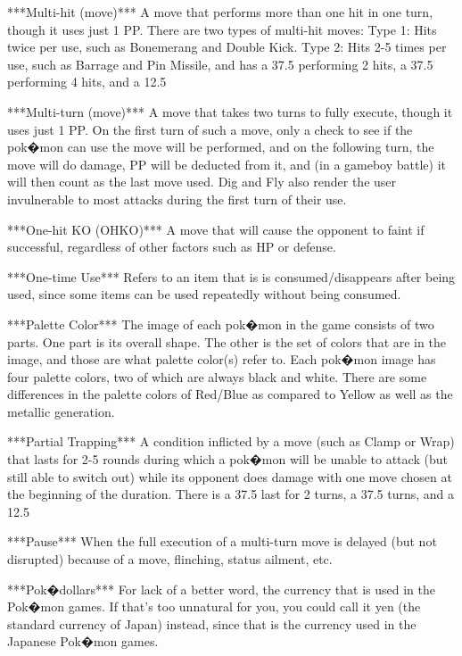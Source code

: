 \documentclass[reprint, aps, prl, paper=A4]{revtex4-1}
\begin{document}
***Multi-hit (move)***
A move that performs more than one hit in one turn, though it uses just 1 PP. There are two
types of multi-hit moves:
     Type 1: Hits twice per use, such as Bonemerang and Double Kick.
     Type 2: Hits 2-5 times per use, such as Barrage and Pin Missile, and has a 37.5%
               performing 2 hits, a 37.5%
               performing 4 hits, and a 12.5%

***Multi-turn (move)***
A move that takes two turns to fully execute, though it uses just 1 PP. On the first turn of
such a move, only a check to see if the pok�mon can use the move will be performed, and on the
following turn, the move will do damage, PP will be deducted from it, and (in a gameboy battle)
it will then count as the last move used. Dig and Fly also render the user invulnerable to most
attacks during the first turn of their use.

***One-hit KO (OHKO)***
A move that will cause the opponent to faint if successful, regardless of other factors such as
HP or defense.

***One-time Use***
Refers to an item that is is consumed/disappears after being used, since some items can be
used repeatedly without being consumed.

***Palette Color***
The image of each pok�mon in the game consists of two parts. One part is its overall shape. The
other is the set of colors that are in the image, and those are what palette color(s) refer to.
Each pok�mon image has four palette colors, two of which are always black and white. There are
some differences in the palette colors of Red/Blue as compared to Yellow as well as the
metallic generation.

***Partial Trapping***
A condition inflicted by a move (such as Clamp or Wrap) that lasts for 2-5 rounds during which
a pok�mon will be unable to attack (but still able to switch out) while its opponent does
damage with one move chosen at the beginning of the duration. There is a 37.5%
last for 2 turns, a 37.5%
turns, and a 12.5%

***Pause***
When the full execution of a multi-turn move is delayed (but not disrupted) because of a move,
flinching, status ailment, etc.

***Pok�dollars***
For lack of a better word, the currency that is used in the Pok�mon games. If that's too
unnatural for you, you could call it yen (the standard currency of Japan) instead, since that
is the currency used in the Japanese Pok�mon games.
\end{document}
